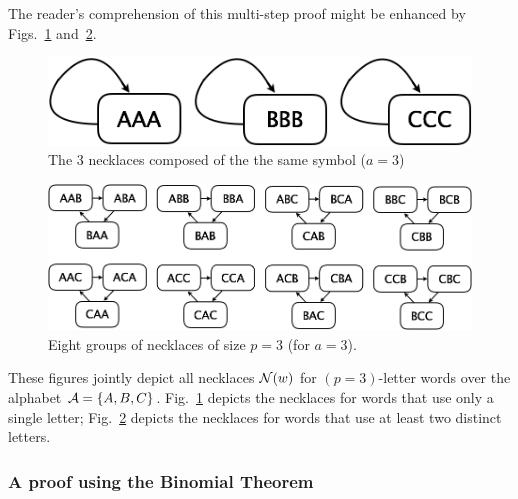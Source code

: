 The reader's comprehension of this multi-step proof might be enhanced
by Figs.~\ref{fig:necklace3} and~\ref{fig:necklace24}.
\begin{figure}[ht]
\begin{center}
        \includegraphics[scale=0.3]{FiguresArithmetic/Necklace3.png}
        \caption{The 3 necklaces composed of the the same symbol ($a=3$)}
        \label{fig:necklace3}
\end{center}
\end{figure}
\begin{figure}[ht]
\begin{center}
        \includegraphics[scale=0.25]{FiguresArithmetic/Necklace24.png}
        \caption{Eight groups of necklaces of size $p=3$ (for $a=3$).}
        \label{fig:necklace24}
\end{center}
\end{figure}
These figures jointly depict all necklaces $\mbox{$\cal N$}(w)$ for $(p=3)$-letter
words over the alphabet $\mbox{$\cal A$} = \{ A,B,C \}$.  Fig.~\ref{fig:necklace3}
depicts the necklaces for words that use only a single letter;
Fig.~\ref{fig:necklace24} depicts the necklaces for words that use at
least two distinct letters.


\subsubsection{A proof using the Binomial Theorem}
\label{sec:FTL-via-BinomialTheorem}

